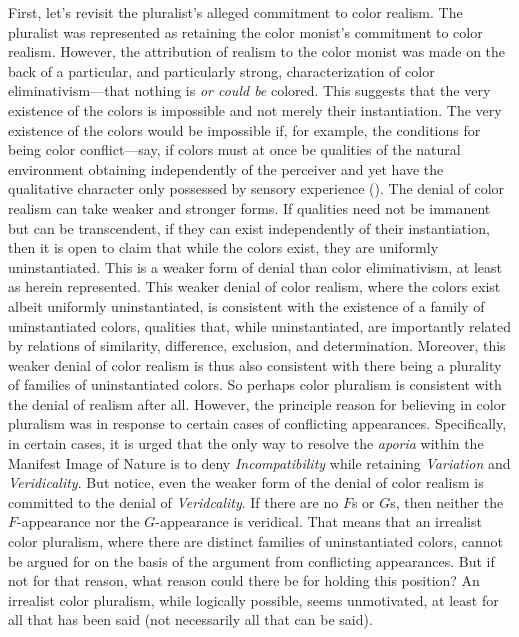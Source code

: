 \documentclass[12pt]{article}
\begin{document}
First, let's revisit the pluralist's alleged commitment to color realism. The pluralist was represented as retaining the color monist's commitment to color realism. However, the attribution of realism to the color monist was made on the back of a particular, and particularly strong, characterization of color eliminativism---that nothing is \emph{or could be} colored. This suggests that the very existence of the colors is impossible and not merely their instantiation. The very existence of the colors would be impossible if, for example, the conditions for being color conflict---say, if colors must at once be qualities of the natural environment obtaining independently of the perceiver and yet have the qualitative character only possessed by sensory experience (\citealt{Boghossian-Velleman:1989af,Smith:1990sm,Boghossian-Velleman:1991as}). The denial of color realism can take weaker and stronger forms. If qualities need not be immanent but can be transcendent, if they can exist independently of their instantiation, then it is open to claim that while the colors exist, they are uniformly uninstantiated. This is a weaker form of denial than color eliminativism, at least as herein represented. This weaker denial of color realism, where the colors exist albeit uniformly uninstantiated, is consistent with the existence of a family of uninstantiated colors, qualities that, while uninstantiated, are importantly related by relations of similarity, difference, exclusion, and determination. Moreover, this weaker denial of color realism is thus also consistent with there being a plurality of families of uninstantiated colors. So perhaps color pluralism is consistent with the denial of realism after all. However, the principle reason for believing in color pluralism was in response to certain cases of conflicting appearances. Specifically, in certain cases, it is urged that the only way to resolve the \emph{aporia} within the Manifest Image of Nature is to deny \emph{Incompatibility} while retaining \emph{Variation} and \emph{Veridicality}. But notice, even the weaker form of the denial of color realism is committed to the denial of \emph{Veridcality}. If there are no \( F \)s or \( G \)s, then neither the \( F \)-appearance nor the \( G \)-appearance is veridical. That means that an irrealist color pluralism, where there are distinct families of uninstantiated colors, cannot be argued for on the basis of the argument from conflicting appearances. But if not for that reason, what reason could there be for holding this position? An irrealist color pluralism, while logically possible, seems unmotivated, at least for all that has been said (not necessarily all that can be said).
\end{document}
